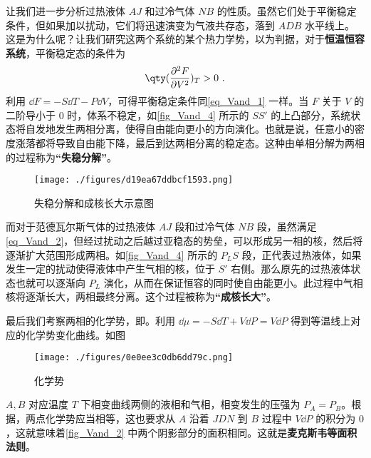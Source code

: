 让我们进一步分析过热液体 $AJ$ 和过冷气体 $NB$ 的性质。虽然它们处于平衡稳定条件，但如果加以扰动，它们将迅速演变为气液共存态，落到 $ADB$ 水平线上。这是为什么呢？让我们研究这两个系统的某个热力学势，以为判据，对于\textbf{恒温恒容系统}，平衡稳定态的条件为
\begin{equation}\label{eq_Vand_2}
\qty(\frac{\partial^2 F}{\partial V^2})_T>0~.
\end{equation}
利用 $\dd F=-S\dd T-P\dd V$，可得平衡稳定条件同\autoref{eq_Vand_1} 一样。当 $F$ 关于 $V$ 的二阶导小于 $0$ 时，体系不稳定，如\autoref{fig_Vand_4} 所示的 $SS'$ 的上凸部分，系统状态将自发地发生两相分离，使得自由能向更小的方向演化。也就是说，任意小的密度涨落都将导致自由能下降，最后到达两相分离的稳定态。这种由单相分解为两相的过程称为\textbf{“失稳分解”}。
\begin{figure}[ht]
\centering
\texttt{[image: ./figures/d19ea67ddbcf1593.png]}
\caption{失稳分解和成核长大示意图} \label{fig_Vand_4}
\end{figure}
而对于范德瓦尔斯气体的过热液体 $AJ$ 段和过冷气体 $NB$ 段，虽然满足\autoref{eq_Vand_2}，但经过扰动之后越过亚稳态的势垒，可以形成另一相的核，然后将逐渐扩大范围形成两相。如\autoref{fig_Vand_4} 所示的 $P_LS$ 段，正代表过热液体，如果发生一定的扰动使得液体中产生气相的核，位于 $S'$ 右侧。那么原先的过热液体状态也就可以逐渐向 $P_L$ 演化，从而在保证恒容的同时使自由能更小。此过程中气相核将逐渐长大，两相最终分离。这个过程被称为\textbf{“成核长大”}。



最后我们考察两相的化学势，即。利用 $\dd \mu=-S\dd T+V\dd P=V\dd P$ 得到等温线上对应的化学势变化曲线。如图

\begin{figure}[ht]
\centering
\texttt{[image: ./figures/0e0ee3c0db6dd79c.png]}
\caption{化学势} \label{fig_Vand_3}
\end{figure}
$A,B$ 对应温度 $T$ 下相变曲线两侧的液相和气相，相变发生的压强为 $P_A=P_B$。根据，两点化学势应当相等，这也要求从 $A$ 沿着 $JDN$ 到 $B$ 过程中 $V\dd P$ 的积分为 $0$，这就意味着\autoref{fig_Vand_2} 中两个阴影部分的面积相同。这就是\textbf{麦克斯韦等面积法则}。
